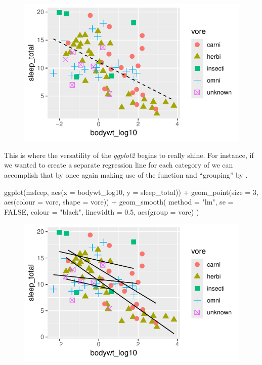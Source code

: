 \vspace{2em}

\begin{figure}[H]
\includegraphics[scale = 0.75]{graphics/ch2Figs/ggEx_11.pdf}
\end{figure}

This is where the versatility of the \textit{ggplot2} begins to really shine.  For instance, if we wanted to create a separate regression line for each category of  we can accomplish that by once again making use of the  function and ``grouping'' by .

\begin{inR}
ggplot(msleep, aes(x = bodywt_log10, y = sleep_total)) +
  geom_point(size = 3, aes(colour = vore, shape = vore)) +
  geom_smooth(
    method = "lm",
    se = FALSE,
    colour = "black",
    linewidth = 0.5,
    aes(group = vore)
  )
\end{inR}

\vspace{2em}

\begin{figure}[H]
\includegraphics[scale = 0.75]{graphics/ch2Figs/ggEx_12.pdf}
\end{figure}

